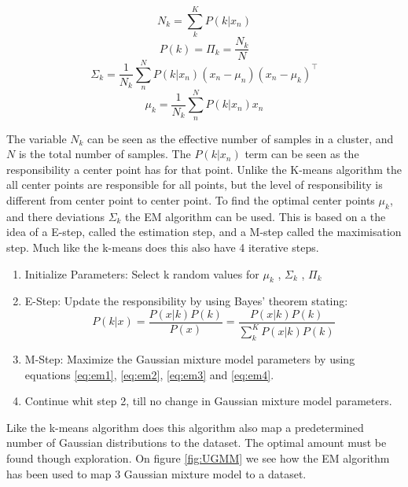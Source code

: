 \begin{equation}
 N_k = \sum\limits_{k}^K P(k|x_n)
 \label{eq:em1}
\end{equation}
\begin{equation}
 P(k)= \Pi_k = \frac{N_k}{N}
 \label{eq:em2}
\end{equation}
\begin{equation}
 \Sigma_k= \frac{1}{N_k} \sum\limits_{n}^N{ P(k|x_n) (x_n -\mu_n)(x_n-\mu_k)^\intercal}
 \label{eq:em3}
\end{equation}
\begin{equation}
 \mu_k= \frac{1}{N_k} \sum\limits_{n}^N{ P(k|x_n) x_n}
 \label{eq:em4}
\end{equation}

The variable $N_k$ can be seen as the effective number of samples in a cluster, and $N$ is the total number of samples. The $P(k|x_n)$ term can be seen as the responsibility a center point has for that point. Unlike the K-means algorithm the all center points are responsible for all points, but the level of responsibility is different from center point to center point. To find the optimal center points $\mu_k$, and there deviations $\Sigma_k$ the EM algorithm can be used. This is based on a the idea of a E-step, called the estimation step, and a M-step called the maximisation step. Much like the k-means does this also have 4 iterative steps. 


\begin{enumerate}
  \item Initialize Parameters: Select k random values for $\mu_k$ , $\Sigma_k$ , $\Pi_k$
  \item E-Step: Update the responsibility by using Bayes' theorem stating: 
 \begin{equation}
 	P(k|x) = \frac{P(x|k) P(k)}{P(x)} = \frac{P(x|k) P(k)}{\sum\limits_{k}^K{ P(x|k) P(k)}}
 \end{equation}
  
  \item M-Step: Maximize the Gaussian mixture model parameters by using equations \ref{eq:em1}, \ref{eq:em2}, \ref{eq:em3} and \ref{eq:em4}. 
  
  \item Continue whit step 2, till no change in Gaussian mixture model parameters. 
\end{enumerate}

Like the k-means algorithm does this algorithm also map a predetermined number of Gaussian distributions to the dataset. The optimal amount must be found though exploration. On figure \ref{fig:UGMM} we see how the EM algorithm has been used to map 3 Gaussian mixture model to a dataset. 

